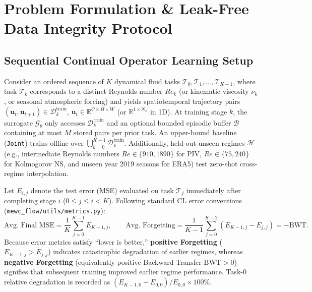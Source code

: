 \documentclass[11pt,a4paper]{article}
\begin{document}
\section{Problem Formulation \& Leak-Free Data Integrity Protocol}

\subsection{Sequential Continual Operator Learning Setup}

Consider an ordered sequence of $K$ dynamical fluid tasks $\mathcal{T}_0, \mathcal{T}_1, \dots, \mathcal{T}_{K-1}$, where task $\mathcal{T}_k$ corresponds to a distinct Reynolds number $Re_k$ (or kinematic viscosity $\nu_k$, or seasonal atmospheric forcing) and yields spatiotemporal trajectory pairs $(\mathbf{u}_t, \mathbf{u}_{t+1}) \in \mathcal{D}_k^{\text{train}}$, $\mathbf{u}_t \in \mathbb{R}^{C \times H \times W}$ (or $\mathbb{R}^{1 \times N_x}$ in 1D). At training stage $k$, the surrogate $\mathcal{G}_{\theta}$ only accesses $\mathcal{D}_k^{\text{train}}$ and an optional bounded episodic buffer $\mathcal{B}$ containing at most $M$ stored pairs per prior task. An upper-bound baseline (\texttt{Joint}) trains offline over $\bigcup_{k=0}^{K-1} \mathcal{D}_k^{\text{train}}$. Additionally, held-out unseen regimes $\mathcal{H}$ (e.g., intermediate Reynolds numbers $Re \in \{910, 1890\}$ for PIV, $Re \in \{75, 240\}$ for Kolmogorov NS, and unseen year 2019 seasons for ERA5) test zero-shot cross-regime interpolation.

Let $E_{i, j}$ denote the test error (MSE) evaluated on task $\mathcal{T}_j$ immediately after completing stage $i$ ($0 \le j \le i < K$). Following standard CL error conventions (\texttt{mewc\_flow/utils/metrics.py}):
\begin{equation}
\text{Avg.\ Final MSE} = \frac{1}{K} \sum_{j=0}^{K-1} E_{K-1, j}, \qquad \text{Avg.\ Forgetting} = \frac{1}{K - 1} \sum_{j=0}^{K-2} \left(E_{K-1, j} - E_{j, j}\right) = -\text{BWT}.
\end{equation}
Because error metrics satisfy ``lower is better,'' \textbf{positive Forgetting} ($E_{K-1,j} > E_{j,j}$) indicates catastrophic degradation of earlier regimes, whereas \textbf{negative Forgetting} (equivalently positive Backward Transfer $\text{BWT} > 0$) signifies that subsequent training improved earlier regime performance. Task-0 relative degradation is recorded as $(E_{K-1,0} - E_{0,0}) / E_{0,0} \times 100\%$.
\end{document}
